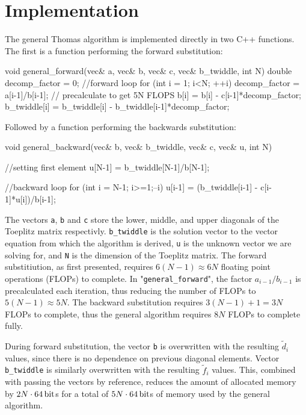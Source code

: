 \documentclass[english,notitlepage,reprint,nofootinbib]{revtex4-1}  %
\begin{document}
\section{Implementation} \label{sec:III}
The general Thomas algorithm is implemented directly in two C++ functions. The first is a function performing the forward substitution:
\begin{cpp}
void general_forward(vec& a, vec& b, vec& c, vec& b_twiddle, int N)
{
  double decomp_factor = 0;
  //forward loop
  for (int i = 1; i<N; ++i){
    decomp_factor = a[i-1]/b[i-1];  // precalculate to get 5N FLOPS
    b[i] = b[i] - c[i-1]*decomp_factor;
    b_twiddle[i] = b_twiddle[i] - b_twiddle[i-1]*decomp_factor;
  }
}
\end{cpp}
Followed by a function performing the backwards substitution:
\begin{cpp}
void general_backward(vec& b, vec& b_twiddle, vec& c, vec& u, int N)
{
  //setting first element
  u[N-1] = b_twiddle[N-1]/b[N-1];

  //backward loop
  for (int i = N-1; i>=1;--i){
    u[i-1] = (b_twiddle[i-1] - c[i-1]*u[i])/b[i-1];
  }
}
\end{cpp}
The vectors \verb+a+, \verb+b+ and \verb+c+ store the lower, middle, and upper diagonals of the Toeplitz matrix respectivly. \verb+b_twiddle+ is the solution vector to the vector equation from which the algorithm is derived, \verb+u+ is the unknown vector we are solving for, and \verb+N+ is the dimension of the Toeplitz matrix. The forward substitiution, as first presented, requires \(6(N-1)\approx 6N\) floating point operations (FLOPs) to complete. In "\verb+general_forward+", the factor \(a_{i-1}/b_{i-1}\) is precalculated each iteration, thus reducing the number of FLOPs to \(5(N-1)\approx 5N\). The backward substitution requires \(3(N-1)+1 = 3N\) FLOPs to complete, thus the general algorithm requires \(8N\) FLOPs to complete fully.

During forward substitution, the vector \verb+b+ is overwritten with the resulting \(\tilde{d}_{i}\) values, since there is no dependence on previous diagonal elements. Vector \verb+b_twiddle+ is similarly overwritten with the resulting \(\tilde{f}_{i}\) values. This, combined with passing the vectors by reference, reduces the amount of allocated memory by \(2N\cdot \SI{64}{\bit}\)s for a total of \(5N\cdot \SI{64}{\bit}\)s of memory used by the general algorithm.
\end{document}
